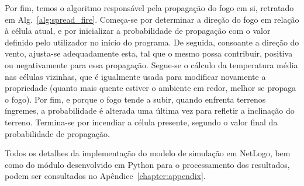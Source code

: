 Por fim, temos o algoritmo responsável pela propagação do fogo em si, retratado em Alg.~\ref{alg:spread_fire}. Começa-se por determinar a direção do fogo em relação à célula atual, e por inicializar a probabilidade de propagação com o valor definido pelo utilizador no início do programa. De seguida, consoante a direção do vento, ajusta-se adequadamente esta, tal que o mesmo possa contribuir, positiva ou negativamente para essa propagação. Segue-se o cálculo da temperatura média nas células vizinhas, que é igualmente usada para modificar novamente a propriedade (quanto mais quente estiver o ambiente em redor, melhor se propaga o fogo). Por fim, e porque o fogo tende a subir, quando enfrenta terrenos íngremes, a probabilidade é alterada uma última vez para refletir a inclinação do terreno. Termina-se por incendiar a célula presente, segundo o valor final da probabilidade de propagação.

Todos os detalhes da implementação do modelo de simulação em NetLogo, bem como do módulo desenvolvido em Python para o processamento dos resultados, podem ser consultados no Apêndice~\ref{chapter:appendix}.